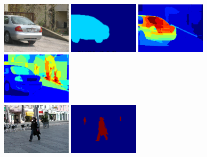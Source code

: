\begin{figure}[tbp]
	\begin{center}
        \includegraphics[width=35mm]{images/car1_img.png}\hspace*{0.7ex}
        \includegraphics[width=35mm]{images/car1_gt.png}\hspace*{0.7ex}
        \includegraphics[width=35mm]{images/car1_pos.png}\hspace*{0.7ex}
        \includegraphics[width=35mm]{images/car1_neg.png}\hspace*{0.7ex}\\
        \vspace{1mm}
        \includegraphics[width=35mm]{images/person1_img.png}\hspace*{0.7ex}
        \includegraphics[width=35mm]{images/person1_gt.png}\hspace*{0.7ex}

\end{center}
\end{figure}

